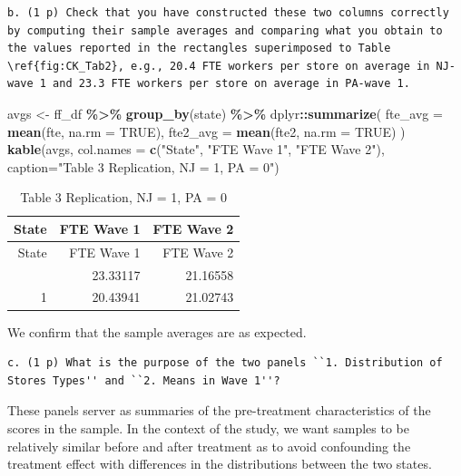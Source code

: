\documentclass[
]{article}
\newenvironment{Shaded}{\begin{snugshade}}{\end{snugshade}}
\newcommand{\AttributeTok}[1]{\textcolor[rgb]{0.13,0.29,0.53}{#1}}
\newcommand{\ConstantTok}[1]{\textcolor[rgb]{0.56,0.35,0.01}{#1}}
\newcommand{\FunctionTok}[1]{\textcolor[rgb]{0.13,0.29,0.53}{\textbf{#1}}}
\newcommand{\NormalTok}[1]{#1}
\newcommand{\OtherTok}[1]{\textcolor[rgb]{0.56,0.35,0.01}{#1}}
\newcommand{\SpecialCharTok}[1]{\textcolor[rgb]{0.81,0.36,0.00}{\textbf{#1}}}
\newcommand{\StringTok}[1]{\textcolor[rgb]{0.31,0.60,0.02}{#1}}
\begin{document}
\begin{verbatim}
b. (1 p) Check that you have constructed these two columns correctly by computing their sample averages and comparing what you obtain to the values reported in the rectangles superimposed to Table \ref{fig:CK_Tab2}, e.g., 20.4 FTE workers per store on average in NJ-wave 1 and 23.3 FTE workers per store on average in PA-wave 1. 
\end{verbatim}

\begin{Shaded}
\begin{Highlighting}[]
\NormalTok{avgs }\OtherTok{\textless{}{-}}\NormalTok{ ff\_df }\SpecialCharTok{\%\textgreater{}\%} \FunctionTok{group\_by}\NormalTok{(state) }\SpecialCharTok{\%\textgreater{}\%}
\NormalTok{  dplyr}\SpecialCharTok{::}\FunctionTok{summarize}\NormalTok{(}
    \AttributeTok{fte\_avg =} \FunctionTok{mean}\NormalTok{(fte, }\AttributeTok{na.rm =} \ConstantTok{TRUE}\NormalTok{),}
    \AttributeTok{fte2\_avg =} \FunctionTok{mean}\NormalTok{(fte2, }\AttributeTok{na.rm =} \ConstantTok{TRUE}\NormalTok{)}
\NormalTok{  )}
\FunctionTok{kable}\NormalTok{(avgs, }\AttributeTok{col.names =} \FunctionTok{c}\NormalTok{(}\StringTok{"State"}\NormalTok{, }\StringTok{"FTE Wave 1"}\NormalTok{, }\StringTok{"FTE Wave 2"}\NormalTok{), }\AttributeTok{caption=}\StringTok{"Table 3 Replication, NJ = 1, PA = 0"}\NormalTok{)}
\end{Highlighting}
\end{Shaded}

\begin{longtable}[]{@{}rrr@{}}
\caption{Table 3 Replication, NJ = 1, PA = 0}\tabularnewline
\toprule\noalign{}
State & FTE Wave 1 & FTE Wave 2 \\
\midrule\noalign{}
\endfirsthead
\toprule\noalign{}
State & FTE Wave 1 & FTE Wave 2 \\
\midrule\noalign{}
\endhead
\bottomrule\noalign{}
\endlastfoot
0 & 23.33117 & 21.16558 \\
1 & 20.43941 & 21.02743 \\
\end{longtable}

We confirm that the sample averages are as expected.

\begin{verbatim}
c. (1 p) What is the purpose of the two panels ``1. Distribution of Stores Types'' and ``2. Means in Wave 1''?
\end{verbatim}

These panels server as summaries of the pre-treatment characteristics of
the scores in the sample. In the context of the study, we want samples
to be relatively similar before and after treatment as to avoid
confounding the treatment effect with differences in the distributions
between the two states.
\end{document}
